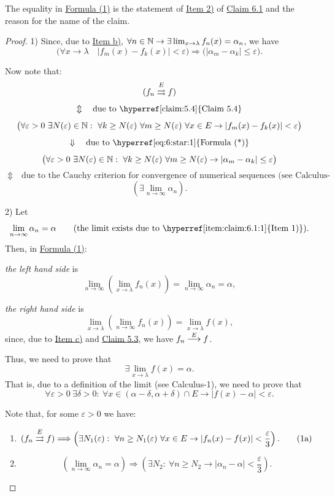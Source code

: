 The equality in \hyperref[eq:6:1:1]{Formula (1)} is the statement of \hyperref[item:claim:6.1:2]{Item 2)} of \hyperref[claim:6.1]{Claim 6.1} and the reason for the name of the claim.

\begin{proof}
1) Since, due to \hyperref[item:claim:6.1:b]{Item b)}, $\forall n\in\mathbb{N}\to\exists\lim_{x\to\lambda}f_n(x)=\alpha_n$, we have
\[
\bigl(\forall x\to\lambda\quad |f_m(x)-f_k(x)|<\varepsilon\bigr)
\Longrightarrow
\bigl(|\alpha_m-\alpha_k|\leq\varepsilon\bigr).
\tag{*}\label{eq:6:star:1}
\]

Now note that:
\[
(f_n\mathrel{\overset{E}{\rightrightarrows}}f)
\]
\[
\Updownarrow\quad\text{due to \hyperref[claim:5.4]{Claim 5.4}}
\]
\[
\bigl(\forall\varepsilon>0\ \exists N(\varepsilon)\in\mathbb{N}:\ \forall k\geq N(\varepsilon)\ \forall m\geq N(\varepsilon)\ \forall x\in E
\to |f_m(x)-f_k(x)|<\varepsilon\bigr)
\]
\[
\Downarrow\quad\text{due to \hyperref[eq:6:star:1]{Formula (*)}}
\]
\[
\bigl(\forall\varepsilon>0\ \exists N(\varepsilon)\in\mathbb{N}:\ \forall k\geq N(\varepsilon)\ \forall m\geq N(\varepsilon)
\to |\alpha_m-\alpha_k|\leq\varepsilon\bigr)
\]
\[
\Updownarrow\quad\text{due to the Cauchy criterion for convergence of numerical sequences (see Calculus-1)}
\]
\[
\left(\exists\lim_{n\to\infty}\alpha_n\right).
\]

2) Let
\[
\lim_{n\to\infty}\alpha_n=\alpha
\qquad\text{(the limit exists due to \hyperref[item:claim:6.1:1]{Item 1)}).}
\]
Then, in \hyperref[eq:6:1:1]{Formula (1)}:

\emph{the left hand side} is
\[
\lim_{n\to\infty}\left(\lim_{x\to\lambda}f_n(x)\right)
=\lim_{n\to\infty}\alpha_n=\alpha,
\]

\emph{the right hand side} is
\[
\lim_{x\to\lambda}\left(\lim_{n\to\infty}f_n(x)\right)
=\lim_{x\to\lambda}f(x),
\]
since, due to \hyperref[item:claim:6.1:c]{Item c)} and \hyperref[claim:5.3]{Claim 5.3}, we have $f_n\mathrel{\overset{E}{\longrightarrow}}f$.

Thus, we need to prove that
\[
\exists\lim_{x\to\lambda}f(x)=\alpha.
\]
That is, due to a definition of the limit (see Calculus-1), we need to prove that
\[
\forall\varepsilon>0\ \exists\delta>0:\ \forall x\in(\alpha-\delta,\alpha+\delta)\cap E
\to |f(x)-\alpha|<\varepsilon.
\tag{**}\label{eq:6:starstar:1}
\]

Note that, for some $\varepsilon>0$ we have:

\begin{enumerate}[label=\roman*)]
\item
\[
(f_n\mathrel{\overset{E}{\rightrightarrows}}f)
\Longrightarrow
\left(\exists N_1(\varepsilon):\ \forall n\geq N_1(\varepsilon)\ \forall x\in E
\to |f_n(x)-f(x)|<\frac{\varepsilon}{3}\right).
\tag{1a}\label{eq:6:1a:1}
\]
\item
\[
\left(\lim_{n\to\infty}\alpha_n=\alpha\right)
\Longrightarrow
\left(\exists N_2:\ \forall n\geq N_2\to |\alpha_n-\alpha|<\frac{\varepsilon}{3}\right).
\tag{2}\label{eq:6:2:1}
\]
\end{enumerate}


\end{proof}
